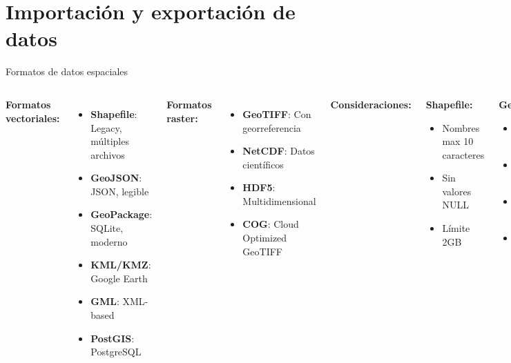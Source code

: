 \documentclass[10pt,aspectratio=169]{beamer}
\begin{document}
\section{Importación y exportación de datos}

\begin{frame}[fragile]{Formatos de datos espaciales}
    \begin{columns}[T]
        \textbf{Formatos vectoriales:}
        \begin{itemize}
            \item \textbf{Shapefile}: Legacy, múltiples archivos
            \item \textbf{GeoJSON}: JSON, legible
            \item \textbf{GeoPackage}: SQLite, moderno
            \item \textbf{KML/KMZ}: Google Earth
            \item \textbf{GML}: XML-based
            \item \textbf{PostGIS}: PostgreSQL
        \end{itemize}
        
        \vspace{0.3cm}
        \textbf{Formatos raster:}
        \begin{itemize}
            \item \textbf{GeoTIFF}: Con georreferencia
            \item \textbf{NetCDF}: Datos científicos
            \item \textbf{HDF5}: Multidimensional
            \item \textbf{COG}: Cloud Optimized GeoTIFF
        \end{itemize}
        
        \textbf{Consideraciones:}
        \begin{tcolorbox}[colframe=usachred,colback=red!5]
        \textbf{Shapefile:}
        \begin{itemize}
            \item Nombres max 10 caracteres
            \item Sin valores NULL
            \item Límite 2GB
        \end{itemize}
        \end{tcolorbox}
        
        \begin{tcolorbox}[colframe=codegreen,colback=green!5]
        \textbf{GeoPackage:}
        \begin{itemize}
            \item Un solo archivo
            \item Múltiples capas
            \item Sin límites de tamaño
            \item Soporte completo SQL
        \end{itemize}
        \end{tcolorbox}
    \end{columns}
\end{frame}
\end{document}
